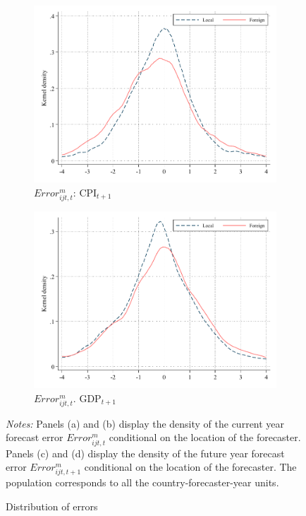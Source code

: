 \documentclass[letterpaper,12pt]{article}
\newenvironment{fignote}{\footnotesize \begin{singlespace} \noindent}{\end{singlespace} \par }
\begin{document}
\begin{figure}[h]
		\begin{subfigure}[b]{0.48\textwidth}
		\centering
		\includegraphics[width=1\linewidth]{../output/figures/cpi_future_FE_density}
		\caption{$Error_{ijt,t}^m$: $\text{CPI}_{t+1}$ }
		\label{fig:error_density_cpi_f}
	\end{subfigure}
	\hfill
	\begin{subfigure}[b]{0.48\textwidth}
		\centering
		\includegraphics[width=1\linewidth]{../output/figures/gdp_future_FE_density}
		\caption{$Error_{ijt,t}^m$. $\text{GDP}_{t+1}$ }
		\label{fig:error_density_gdp_f}
	\end{subfigure}
	
	\caption{Distribution of errors}
	\label{fig:errors}
	\begin{fignote}
		\textit{Notes:} Panels (a) and (b) display the density of the current year forecast error $Error_{ijt,t}^m$ conditional on the location of the forecaster. Panels (c) and (d) display the density of the future year forecast error $Error_{ijt,t+1}^m$ conditional on the location of the forecaster. The population corresponds to all the country-forecaster-year units.
	\end{fignote}
\end{figure}
\end{document}
